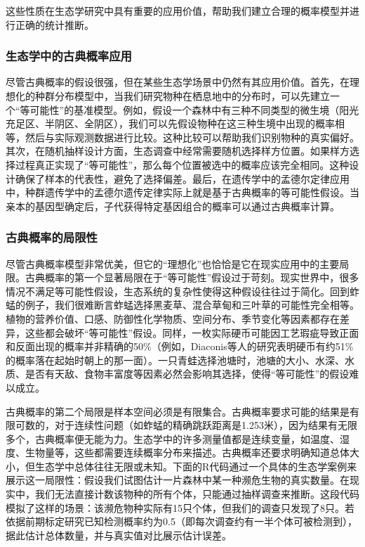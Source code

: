 \documentclass[
  twoside,12pt,fontset=none]{ctexbook}
\begin{document}
这些性质在生态学研究中具有重要的应用价值，帮助我们建立合理的概率模型并进行正确的统计推断。

\hypertarget{ux751fux6001ux5b66ux4e2dux7684ux53e4ux5178ux6982ux7387ux5e94ux7528}{%
\subsubsection{生态学中的古典概率应用}\label{ux751fux6001ux5b66ux4e2dux7684ux53e4ux5178ux6982ux7387ux5e94ux7528}}

尽管古典概率的假设很强，但在某些生态学场景中仍然有其应用价值。首先，在理想化的种群分布模型中，当我们研究物种在栖息地中的分布时，可以先建立一个``等可能性''的基准模型。例如，假设一个森林中有三种不同类型的微生境（阳光充足区、半阴区、全阴区），我们可以先假设物种在这三种生境中出现的概率相等，然后与实际观测数据进行比较。这种比较可以帮助我们识别物种的真实偏好。其次，在随机抽样设计方面，生态调查中经常需要随机选择样方位置。如果样方选择过程真正实现了``等可能性''，那么每个位置被选中的概率应该完全相同。这种设计确保了样本的代表性，避免了选择偏差。最后，在遗传学中的孟德尔定律应用中，种群遗传学中的孟德尔遗传定律实际上就是基于古典概率的等可能性假设。当亲本的基因型确定后，子代获得特定基因组合的概率可以通过古典概率计算。

\hypertarget{ux53e4ux5178ux6982ux7387ux7684ux5c40ux9650ux6027}{%
\subsubsection{古典概率的局限性}\label{ux53e4ux5178ux6982ux7387ux7684ux5c40ux9650ux6027}}

尽管古典概率模型非常优美，但它的``理想化''也恰恰是它在现实应用中的主要局限。古典概率的第一个显著局限在于``等可能性''假设过于苛刻。现实世界中，很多情况不满足等可能性假设，生态系统的复杂性使得这种假设往往过于简化。回到蚱蜢的例子，我们很难断言蚱蜢选择黑麦草、混合草甸和三叶草的可能性完全相等。植物的营养价值、口感、防御性化学物质、空间分布、季节变化等因素都存在差异，这些都会破坏``等可能性''假设。同样，一枚实际硬币可能因工艺瑕疵导致正面和反面出现的概率并非精确的50\%（例如，Diaconis等人的研究表明硬币有约51\%的概率落在起始时朝上的那一面）。一只青蛙选择池塘时，池塘的大小、水深、水质、是否有天敌、食物丰富度等因素必然会影响其选择，使得``等可能性''的假设难以成立。

古典概率的第二个局限是样本空间必须是有限集合。古典概率要求可能的结果是有限可数的，对于连续性问题（如蚱蜢的精确跳跃距离是1.253米），因为结果有无限多个，古典概率便无能为力。生态学中的许多测量值都是连续变量，如温度、湿度、生物量等，这些都需要连续概率分布来描述。古典概率还要求明确知道总体大小，但生态学中总体往往无限或未知。下面的R代码通过一个具体的生态学案例来展示这一局限性：假设我们试图估计一片森林中某一种濒危生物的真实数量。在现实中，我们无法直接计数该物种的所有个体，只能通过抽样调查来推断。这段代码模拟了这样的场景：该濒危物种实际有15只个体，但我们的调查只发现了8只。若依据前期标定研究已知检测概率约为0.5（即每次调查约有一半个体可被检测到），据此估计总体数量，并与真实值对比展示估计误差。
\end{document}
